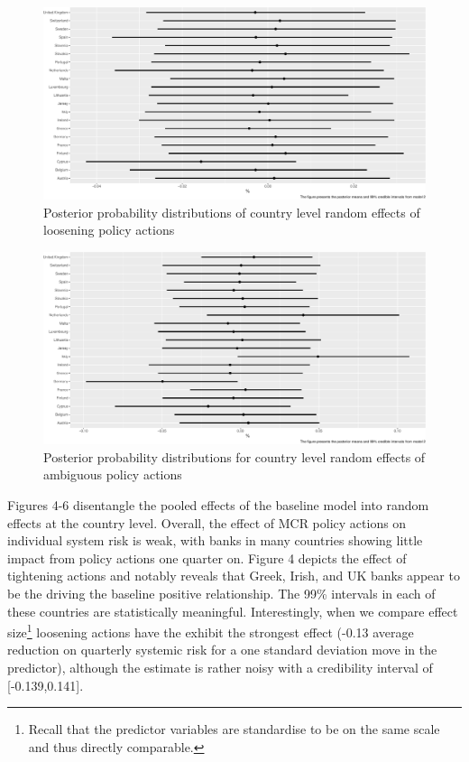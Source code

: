 \documentclass[
  10pt,
]{article}
\begin{document}
\begin{figure}[H]
\includegraphics{figures/paper-fig6-1} \caption{Posterior probability distributions of country level random effects of loosening policy actions}\label{fig:fig6}
\end{figure}

\begin{figure}[H]
\includegraphics{figures/paper-fig7-1} \caption{Posterior probability distributions for country level random effects of ambiguous policy actions}\label{fig:fig7}
\end{figure}

Figures 4-6 disentangle the pooled effects of the baseline model into
random effects at the country level. Overall, the effect of MCR policy
actions on individual system risk is weak, with banks in many countries
showing little impact from policy actions one quarter on. Figure 4
depicts the effect of tightening actions and notably reveals that Greek,
Irish, and UK banks appear to be the driving the baseline positive
relationship. The 99\% intervals in each of these countries are
statistically meaningful. Interestingly, when we compare effect
size\footnote{Recall that the predictor variables are standardise to be
  on the same scale and thus directly comparable.} loosening actions
have the exhibit the strongest effect (-0.13 average reduction on
quarterly systemic risk for a one standard deviation move in the
predictor), although the estimate is rather noisy with a credibility
interval of {[}-0.139,0.141{]}.
\end{document}
